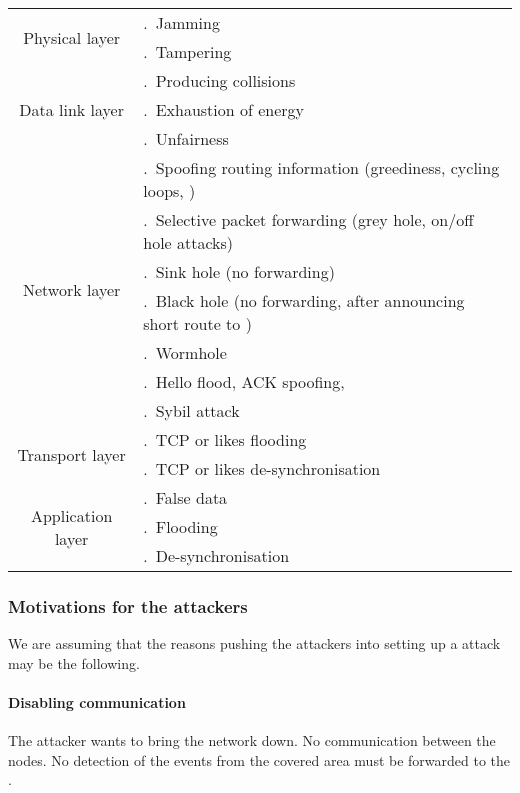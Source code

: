 \setcounter{ItemNumber}{1}
\newcommand\num[1]{\theItemNumber.~#1\stepcounter{ItemNumber}}
\begin{center} \begin{small}
\noindent%
\begin{tabular}{c|l}
	\toprule
	\multirow{2}{*}{Physical layer}%
		& \num{Jamming}\\
		& \num{Tampering}\\
	\midrule
	\multirow{3}{*}{Data link layer}%
		& \num{Producing collisions}\\
		& \num{Exhaustion of energy}\\
		& \num{Unfairness}\\
	\midrule
	\multirow{7}{*}{Network layer}%
		& \num{Spoofing routing information (greediness, cycling loops, \etc)}\\
		& \num{Selective packet forwarding (grey hole, on/off hole attacks)}\\
		& \num{Sink hole (no forwarding)}\\
		& \num{Black hole (no forwarding, after announcing short route to \BS)}\\
		& \num{Wormhole}\\
		& \num{Hello flood, ACK spoofing, \etc}\\
		& \num{Sybil attack}\\
	\midrule
	\multirow{2}{*}{Transport layer}%
		& \num{TCP or likes flooding}\\
		& \num{TCP or likes de-synchronisation}\\
	\midrule
	\multirow{3}{*}{Application layer}%
		& \num{False data}\\
		& \num{Flooding}\\
		& \num{De-synchronisation}\\
	\bottomrule
\end{tabular}
\end{small} \end{center}

\subsubsection{Motivations for the attackers}

We are assuming that the reasons pushing the attackers into setting up a \dos attack may be the following.

\paragraph{Disabling communication}
The attacker wants to bring the network down.
No communication between the nodes.
No detection of the events from the covered area must be forwarded to the \bs.

